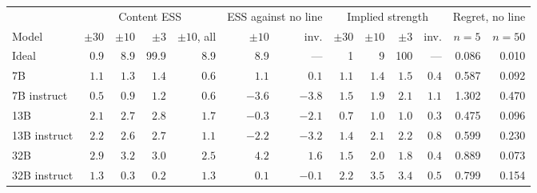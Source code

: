 \begin{tabular}{lrrrrrrrrrrrr}
\toprule
& \multicolumn{4}{c}{Content ESS} & \multicolumn{2}{c}{ESS against no line} & \multicolumn{4}{c}{Implied strength} & \multicolumn{2}{c}{Regret, no line} \\
\cmidrule(lr){2-5}\cmidrule(lr){6-7}\cmidrule(lr){8-11}\cmidrule(lr){12-13}
Model & $\pm 30$ & $\pm 10$ & $\pm 3$ & $\pm 10$, all & $\pm 10$ & inv. & $\pm 30$ & $\pm 10$ & $\pm 3$ & inv. & $n = 5$ & $n = 50$ \\
\midrule
Ideal & 0.9 & 8.9 & 99.9 & 8.9 & 8.9 & --- & 1 & 9 & 100 & --- & 0.086 & 0.010 \\
\midrule
7B & $1.1$ & $1.3$ & $1.4$ & $0.6$ & $1.1$ & $0.1$ & $1.1$ & $1.4$ & $1.5$ & $0.4$ & 0.587 & 0.092 \\
7B instruct & $0.5$ & $0.9$ & $1.2$ & $0.6$ & $-3.6$ & $-3.8$ & $1.5$ & $1.9$ & $2.1$ & $1.1$ & 1.302 & 0.470 \\
13B & $2.1$ & $2.7$ & $2.8$ & $1.7$ & $-0.3$ & $-2.1$ & $0.7$ & $1.0$ & $1.0$ & $0.3$ & 0.475 & 0.096 \\
13B instruct & $2.2$ & $2.6$ & $2.7$ & $1.1$ & $-2.2$ & $-3.2$ & $1.4$ & $2.1$ & $2.2$ & $0.8$ & 0.599 & 0.230 \\
32B & $2.9$ & $3.2$ & $3.0$ & $2.5$ & $4.2$ & $1.6$ & $1.5$ & $2.0$ & $1.8$ & $0.4$ & 0.889 & 0.073 \\
32B instruct & $1.3$ & $0.3$ & $0.2$ & $1.3$ & $0.1$ & $-0.1$ & $2.2$ & $3.5$ & $3.4$ & $0.5$ & 0.799 & 0.154 \\
\bottomrule
\end{tabular}
